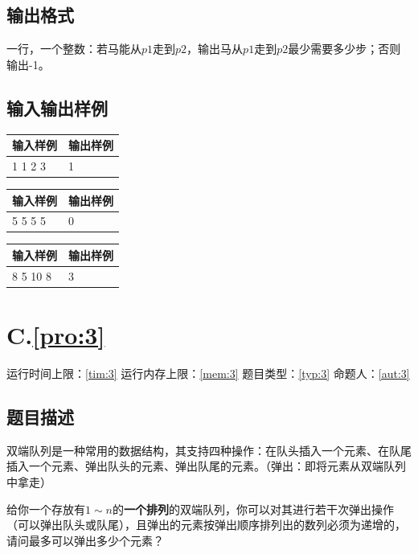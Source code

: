 \documentclass[
	lang=cn,
	color=green
]{elegantbook}
\begin{document}
\section*{输出格式}
一行，一个整数：若马能从$p1$走到$p2$，输出马从$p1$走到$p2$最少需要多少步；否则输出-1。

\section*{输入输出样例}
\begin{tabularx}{450pt}{X|X}
    \toprule
    输入样例 & 输出样例 \\
    \midrule
    1 1 2 3  & 1        \\
    \bottomrule
\end{tabularx}
\vspace{0.5cm}

\begin{tabularx}{450pt}{X|X}
    \toprule
    输入样例 & 输出样例 \\
    \midrule
    5 5 5 5  & 0        \\
    \bottomrule
\end{tabularx}
\vspace{0.5cm}

\begin{tabularx}{450pt}{X|X}
    \toprule
    输入样例 & 输出样例 \\
    \midrule
    8 5 10 8 & 3        \\
    \bottomrule
\end{tabularx}

\newpage
\chapter*{C.\quad \ref*{pro:3}}
\begin{center}
    运行时间上限：\ref*{tim:3} \quad 运行内存上限：\ref*{mem:3} \quad 题目类型：\ref*{typ:3} \quad 命题人：\ref*{aut:3}
\end{center}

\section*{题目描述}
双端队列是一种常用的数据结构，其支持四种操作：在队头插入一个元素、在队尾插入一个元素、弹出队头的元素、弹出队尾的元素。（弹出：即将元素从双端队列中拿走）

给你一个存放有$1 \sim n$的\textbf{一个排列}的双端队列，你可以对其进行若干次弹出操作（可以弹出队头或队尾），且弹出的元素按弹出顺序排列出的数列必须为递增的，请问最多可以弹出多少个元素？
\end{document}
